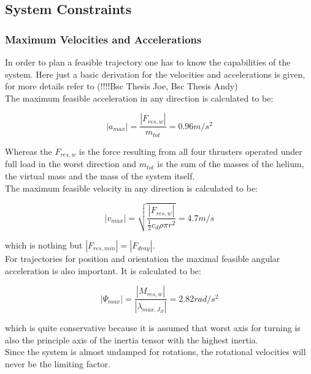 \subsection{System Constraints}
\subsubsection{Maximum Velocities and Accelerations}
In order to plan a feasible trajectory one has to know the capabilities of the system. Here just a basic derivation for the velocities and accelerations is given, for more details refer to (!!!!Bsc Thesis Joe, Bsc Thesis Andy)\\

The maximum feasible acceleration in any direction is calculated to be:

\begin{equation}
  \left|a_{max} \right| =  \frac{\left|F_{res, w}\right|}{m_{tot}} = 0.96 m/s^2
\end{equation}

Whereas the $F_{res,w}$ is the force resulting from all four thrusters operated under full load in the worst direction and $m_{tot}$ is the sum of the masses of the helium, the virtual mass and the mass of the system itself.\\


The maximum feasible velocity in any direction is calculated to be:

\begin{equation}
\left|v_{max} \right| = \sqrt{\frac{\left|F_{res,w} \right|}{\frac{1}{2}c_d \rho \pi r^2}}=4.7 m/s
\end{equation}

which is nothing but $ \left|F_{res,min} \right| = \left|F_{dray} \right| $.\\

For trajectories for position and orientation the maximal feasible angular acceleration is also important. It is calculated to be:

\begin{equation}
  \left|\Psi_{max} \right| =  \frac{\left|M_{res,w}\right|}{\left| \lambda_{max, J_{B}} \right|} = 2.82 rad/s^2 
\end{equation}

which is quite conservative because it is assumed that worst axis for turning is also the principle axis of the inertia tensor with the highest inertia.\\

Since the system is almost undamped for rotations, the rotational velocities will never be the limiting factor.

